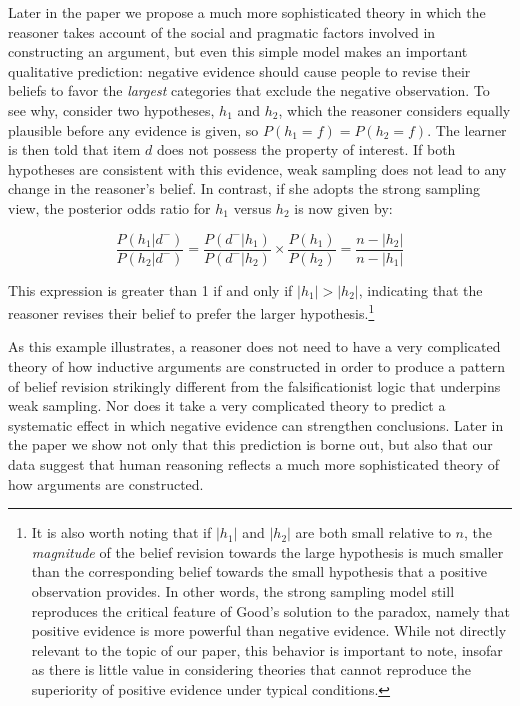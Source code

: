 \documentclass[authoryear,11pt]{elsarticle}
\begin{document}
Later in the paper we propose a much more sophisticated theory in which the reasoner takes account of the social and pragmatic factors involved in constructing an argument, but even this simple model makes an important qualitative prediction: negative evidence should cause people to revise their beliefs to favor the {\it largest} categories that exclude the negative observation. To see why, consider two hypotheses, $h_1$ and $h_2$, which the reasoner considers equally plausible before any evidence is given, so $P(h_1=f) = P(h_2=f)$. The learner is then told that item $d$ does not possess the property of interest. If both hypotheses are consistent with this evidence, weak sampling does not lead to any change in the reasoner's belief. In contrast, if she adopts the strong sampling view, the posterior odds ratio for $h_1$ versus $h_2$ is now given by:

\begin{equation}
\frac{ P(h_1 | d^-) }{ P(h_2 | d^-) } = \frac{ P( d^- | h_1 )}{ P( d^- | h_2 ) } \times \frac{ P(h_1) }{ P(h_2) } = \frac{n-|h_2|}{n-|h_1|}
\label{eq:hsize}
\end{equation}

\noindent This expression is greater than 1 if and only if $|h_1| > |h_2|$, indicating that the reasoner revises their belief to prefer the larger hypothesis.\footnote{It is also worth noting that if $|h_1|$ and $|h_2|$ are both small relative to $n$, the {\it magnitude} of the belief revision towards the large hypothesis is much smaller than the corresponding belief towards the small hypothesis that a positive observation provides. In other words, the strong sampling model still reproduces the critical feature of Good's \citeyear{Good1960} solution to the \citet{Hempel1945} paradox, namely that positive evidence is more powerful than negative evidence. While not directly relevant to the topic of our paper, this behavior is important to note, insofar as there is little value in considering theories that cannot reproduce the superiority of positive evidence under typical conditions.}

As this example illustrates, a reasoner does not need to have a very complicated theory of how inductive arguments are constructed in order to produce a pattern of belief revision strikingly different from the falsificationist logic that underpins weak sampling. Nor does it take a very complicated theory to predict a systematic effect in which negative evidence can strengthen conclusions. Later in the paper we show not only that this prediction is borne out, but also that our data suggest that human reasoning reflects a much more sophisticated theory of how arguments are constructed.
\end{document}
